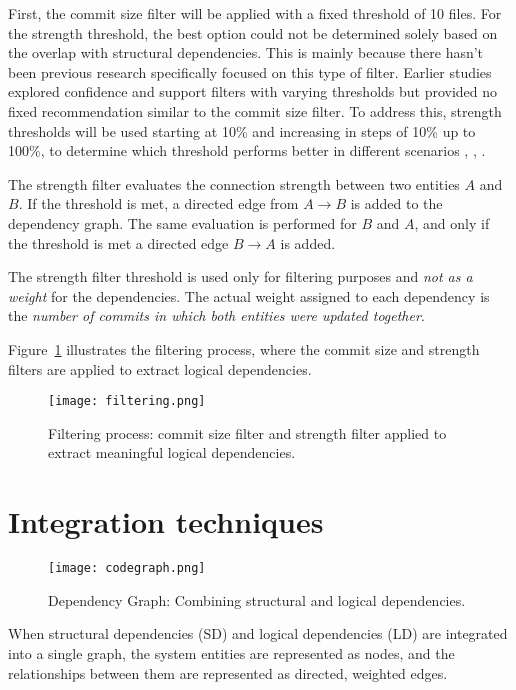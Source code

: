First, the commit size filter will be applied with a fixed threshold of 10 files. For the strength threshold, the best option could not be determined solely based on the overlap with structural dependencies. This is mainly because there hasn’t been previous research specifically focused on this type of filter. Earlier studies explored confidence and support filters with varying thresholds but provided no fixed recommendation similar to the commit size filter. To address this, strength thresholds will be used starting at 10\% and increasing in steps of 10\% up to 100\%, to determine which threshold performs better in different scenarios \cite{b4}, \cite{DepSACI}, \cite{enase19}.

The strength filter evaluates the connection strength between two entities $A$ and $B$. If the threshold is met, a directed edge from $A \rightarrow B$ is added to the dependency graph. The same evaluation is performed for $B$ and $A$, and only if the threshold is met a directed edge $B \rightarrow A$ is added.

The strength filter threshold is used only for filtering purposes and \textit{not as a weight} for the dependencies. The actual weight assigned to each dependency is the \textit{number of commits in which both entities were updated together}.

Figure~\ref{fig:filtering_process} illustrates the filtering process, where the commit size and strength filters are applied to extract logical dependencies.

\begin{figure}[h!]
    \centering
    \texttt{[image: filtering.png]}
    \caption{Filtering process: commit size filter and strength filter applied to extract meaningful logical dependencies.}
    \label{fig:filtering_process}
\end{figure}

\section{Integration techniques}
\label{sec:integration_techniques}



\begin{figure}[t!]
  \centering
  \texttt{[image: codegraph.png]}
  \caption{Dependency Graph: Combining structural and logical dependencies.}
  \label{fig:codegraph}
\end{figure}

\hspace{4em}When structural dependencies (SD) and logical dependencies (LD) are integrated into a single graph, the system entities are represented as nodes, and the relationships between them are represented as directed, weighted edges. 

